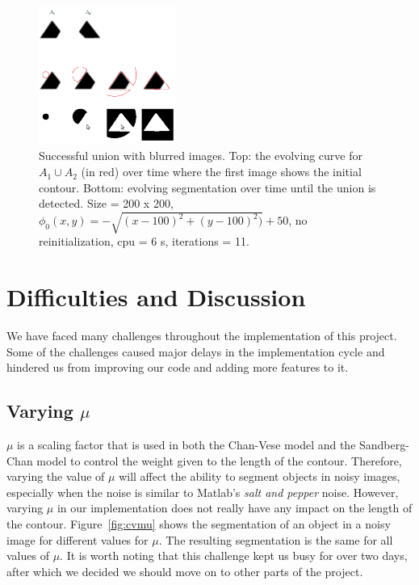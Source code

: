 \documentclass[10pt,twocolumn,letterpaper]{article}
\begin{document}
\begin{figure}[t]
\centering
\includegraphics[width=0.4\textwidth]{sc_blurry.png}
\caption{Successful union with blurred images. Top: the evolving curve for $A_1 \cup A_2$
(in red) over time where the first
image shows the initial
contour. Bottom: evolving segmentation over time until the union is detected. Size = 200 x 200, $\phi_{0}(x,y) = - \sqrt{(x - 100)^2 + (y - 100)^2)} +
50$, no reinitialization, cpu = 6 s, iterations = 11.}
\label{fig:sc_blurry}
\end{figure}



\section{Difficulties and Discussion}
\label{sec:difficulties}
We have faced many challenges throughout the implementation of this project. Some of the challenges caused major delays in the implementation cycle and hindered
us from improving our code and adding more features to it. 

\subsection{Varying $\mu$}
$\mu$ is a scaling factor that is used in both the Chan-Vese model and the Sandberg-Chan model to control the weight given to the length of the contour.
Therefore, varying the value of $\mu$ will affect the ability to segment objects in noisy images, especially when the noise is similar to Matlab's \textit{salt
and pepper} noise. However, varying $\mu$ in our implementation does not really have any impact on the length of the contour. Figure~\ref{fig:cvmu} shows the
segmentation of an object in a noisy image for different values for $\mu$. The resulting segmentation is the same for all values of $\mu$. It is worth noting
that
this challenge kept us busy for over two days, after which we decided we should move on to other parts of the project.
\end{document}
